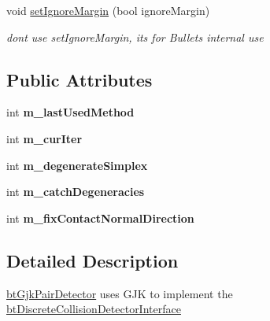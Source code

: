 \begin{DoxyCompactItemize}
\item 
\mbox{\label{classbtGjkPairDetector_a93e9752920c57c39faca247fc005750e}} 
void \hyperlink{classbtGjkPairDetector_a93e9752920c57c39faca247fc005750e}{set\+Ignore\+Margin} (bool ignore\+Margin)
\begin{DoxyCompactList}\small\item\em don\textquotesingle{}t use set\+Ignore\+Margin, it\textquotesingle{}s for Bullet\textquotesingle{}s internal use \end{DoxyCompactList}\end{DoxyCompactItemize}
\subsection*{Public Attributes}
\begin{DoxyCompactItemize}
\item 
\mbox{\label{classbtGjkPairDetector_a54ad1723f4470c39849f2367d235bd63}} 
int {\bfseries m\+\_\+last\+Used\+Method}
\item 
\mbox{\label{classbtGjkPairDetector_ac78c8065175f8c0082ebd95f94607e20}} 
int {\bfseries m\+\_\+cur\+Iter}
\item 
\mbox{\label{classbtGjkPairDetector_a85d196506ed41900a4bb834af461d41d}} 
int {\bfseries m\+\_\+degenerate\+Simplex}
\item 
\mbox{\label{classbtGjkPairDetector_a47b5f1df3aa7d5ce044b56d7ced46859}} 
int {\bfseries m\+\_\+catch\+Degeneracies}
\item 
\mbox{\label{classbtGjkPairDetector_a5d0d6dc51db85ed7088638aca4044cef}} 
int {\bfseries m\+\_\+fix\+Contact\+Normal\+Direction}
\end{DoxyCompactItemize}


\subsection{Detailed Description}
\hyperlink{classbtGjkPairDetector}{bt\+Gjk\+Pair\+Detector} uses G\+JK to implement the \hyperlink{structbtDiscreteCollisionDetectorInterface}{bt\+Discrete\+Collision\+Detector\+Interface} 


